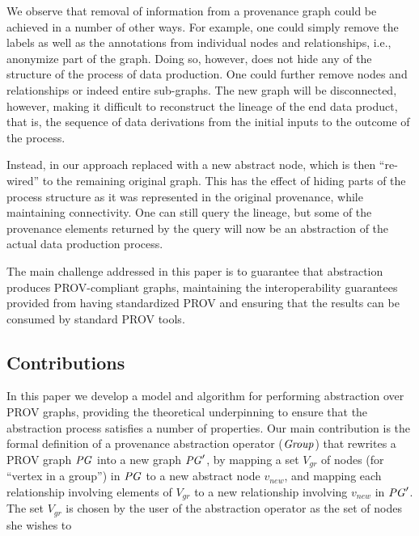 We observe that removal of information from a provenance graph could be achieved in a number of other ways.
%
For example, one could simply remove the labels as well as the annotations from individual nodes and relationships, i.e., anonymize part of the graph. Doing so, however, does not hide any of the structure of the process of data production. One could further remove nodes and relationships or  indeed entire sub-graphs. The new graph will be disconnected, however, making it difficult to reconstruct the lineage of the end data product, that is, the sequence of data derivations from the initial inputs to the outcome of the process.

Instead, in our approach  replaced with a new abstract node, which is then ``re-wired'' to the remaining original graph. This has the effect of hiding parts of the process structure as it was represented in the original provenance, while maintaining connectivity. One can still query the lineage, but some of the provenance elements returned by the query will now be an abstraction of the actual data production process.

The main challenge addressed in this paper is to guarantee that abstraction produces PROV-compliant  graphs,   maintaining the interoperability guarantees provided from having standardized PROV and ensuring that the results can be consumed by standard PROV tools. %


\subsection{Contributions} \label{sec:contributions}

In this paper we develop a model and algorithm for performing  abstraction over PROV graphs, providing the theoretical underpinning to ensure that the abstraction process satisfies a number of properties.
%
Our main contribution is the formal  definition of a provenance abstraction operator ($\mathit{Group}$) that  rewrites  a PROV graph $\mathit{PG}$ into a new graph $\mathit{PG}'$, by  mapping a set $V_{gr}$ of nodes (for ``vertex in a group'') in $\mathit{PG}$ to a new abstract node $v_{new}$, and  mapping each relationship involving elements of $V_{gr}$  to a new relationship involving $v_{new}$ in $\mathit{PG}'$. 
The set $V_{gr}$ is chosen by the user of the abstraction operator as the set of nodes she wishes to 


